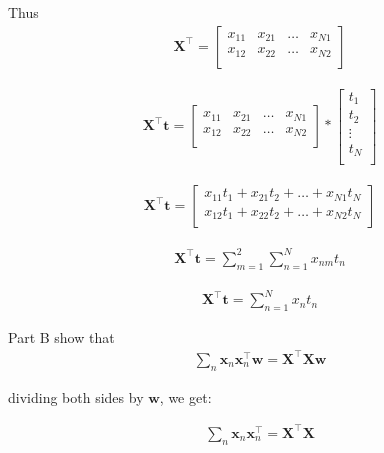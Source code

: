 \documentclass[10pt]{article}
\begin{document}
\begin{enumerate}
Thus
\begin{eqnarray*}
{\mathbf{X}}^\top =
    \begin{bmatrix}
    x_{11} & x_{21} & \hdots & x_{N1} \\[0.3em]
    x_{12} & x_{22} & \hdots & x_{N2} \\[0.3em]
    \end{bmatrix}
\end{eqnarray*}

\begin{eqnarray*}
{\mathbf{X}}^\top\mathbf{t} =
    \begin{bmatrix}
    x_{11} & x_{21} & \hdots & x_{N1} \\[0.3em]
    x_{12} & x_{22} & \hdots & x_{N2} \\[0.3em]
    \end{bmatrix}
    *
    \begin{bmatrix}
    t_1 \\[0.3em]
    t_2 \\[0.3em]
    \vdots \\[0.3em]
    t_N \\[0.3em]
    \end{bmatrix}
\end{eqnarray*}

\begin{eqnarray*}
{\mathbf{X}}^\top\mathbf{t} =
    \begin{bmatrix}
    x_{11} t_1 + x_{21} t_2 + \hdots + x_{N1} t_N \\[0.3em]
    x_{12} t_1 + x_{22} t_2 + \hdots + x_{N2} t_N \\[0.3em]
    \end{bmatrix}
\end{eqnarray*}

\begin{eqnarray*}
{\mathbf{X}}^\top\mathbf{t} =
\sum_{m=1}^2 \sum_{n=1}^N x_{nm} t_n
\end{eqnarray*}

\begin{eqnarray*}
{\mathbf{X}}^\top\mathbf{t} =
\sum_{n=1}^N x_{n} t_n
\end{eqnarray*}

Part B show that
\begin{eqnarray*}
\sum_{n} \mathbf{x}_n \mathbf{x}_n ^\top \mathbf{w} = \mathbf{X}^\top\mathbf{X} \mathbf{w}
\end{eqnarray*}

dividing both sides by $\mathbf{w}$, we get:

\begin{eqnarray*}
\sum_{n} \mathbf{x}_n \mathbf{x}_n ^\top = \mathbf{X}^\top\mathbf{X}
\end{eqnarray*}


\end{enumerate}
\end{document}
